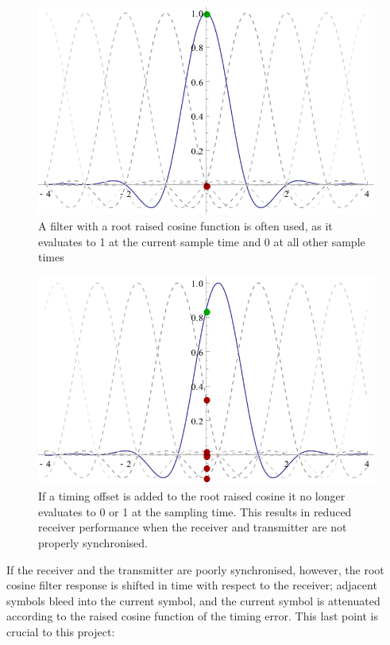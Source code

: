 \begin{figure}[htbp]
\centering
\includegraphics[width=\linewidth]{rrc_sync.png}
\caption{A filter with a root raised cosine function is often used, as
it evaluates to 1 at the current sample time and 0 at all other sample
times}
\end{figure}

\begin{figure}[htbp]
\centering
\includegraphics[width=\linewidth]{rrc_err.png}
\caption{If a timing offset is added to the root raised cosine it no
longer evaluates to 0 or 1 at the sampling time. This results in
reduced receiver performance when the receiver and transmitter are not
properly synchronised.}
\end{figure}

If the receiver and the transmitter are poorly synchronised, however,
the root cosine filter response is shifted in time with respect to the
receiver; adjacent symbols bleed into the current symbol, and the current symbol is attenuated according to the raised cosine function of the timing error. This last point is crucial to this project:

